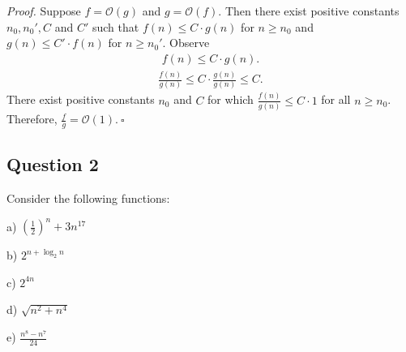 \begin{enumerate}
\textit{Proof. }Suppose $f=\mathcal{O}(g)$ and $g=\mathcal{O}(f)$. Then there exist positive constants $n_0,n_0',C$ and $C'$ such that $f(n)\leq C\cdot g(n)$ for $n\geq n_0$ and $g(n)\leq C'\cdot f(n)$ for $n\geq n_0'$. Observe
\begin{align*}
f(n)\leq C\cdot g(n).
\end{align*}
\begin{align*}
\frac{f(n)}{g(n)}\leq C\cdot\frac{g(n)}{g(n)}\leq C.
\end{align*}
There exist positive constants $n_0$ and $C$ for which $\frac{f(n)}{g(n)}\leq C\cdot 1$ for all $n\geq n_0$. Therefore, $\frac{f}{g}=\mathcal{O}(1)$.$~\square$
\end{enumerate}
\newpage
\subsection*{Question 2}

Consider the following functions:
\begin{multicols}{3}
\begin{description}
    \item a) $\left(\frac{1}{2}\right)^n + 3 n^{17}$
    \item b) $2^{n+\log_2 n}$
    \item c) $2^{4n}$
    \item d) $\sqrt{n^2+n^4}$
    \item e) $\frac{n^8 - n^7}{24}$
\end{description}
\end{multicols}

